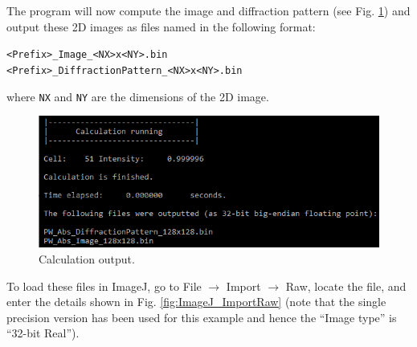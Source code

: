 \documentclass[12pt,a4paper]{article}
\newenvironment{myenv}{\begin{samepage}\begin{adjustwidth}{2cm}{}}{\end{adjustwidth}\end{samepage}}
\begin{document}
The program will now compute the image and diffraction pattern (see Fig. \ref{fig:pw_abs_calc}) and output these 2D images as files named in the following format:
%
\begin{myenv}
    \verb|<Prefix>_Image_<NX>x<NY>.bin| \\
    \verb|<Prefix>_DiffractionPattern_<NX>x<NY>.bin|
\end{myenv}
%
where \verb|NX| and \verb|NY| are the dimensions of the 2D image.

\begin{figure}[!h]
\begin{center}
    \includegraphics[scale=0.75]{pw_abs_calc.png}
\caption{Calculation output.}
\label{fig:pw_abs_calc}
\end{center}
\end{figure}

To load these files in ImageJ, go to File $\rightarrow$ Import $\rightarrow$ Raw, locate the file, and enter the details shown in Fig. \ref{fig:ImageJ_ImportRaw} (note that the single precision version has been used for this example and hence the ``Image type'' is ``32-bit Real'').
\end{document}
